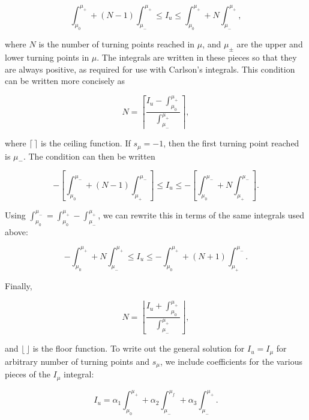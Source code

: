 \documentclass[apj]{emulateapj}
\begin{document}
\begin{equation}\label{tpbad}
 \int_{\mu_0}^{\mu_+} + (N-1) \int_{\mu_-}^{\mu_+} \le I_u \le \int_{\mu_0}^{\mu_+} + N \int_{\mu_-}^{\mu_+},
\end{equation}

\noindent where $N$ is the number of turning points reached in $\mu$, and $\mu_\pm$ are the upper and lower turning points in $\mu$. The integrals are written in these pieces so that they are always positive, as required for use with Carlson's integrals. This condition can be written more concisely as

\begin{equation}\label{tp}
  N = \left \lceil \frac{I_u - \int_{\mu_0}^{\mu_+}}{\int_{\mu_-}^{\mu_+}} \right \rceil,
\end{equation}

\noindent where $\lceil \hspace{2pt} \rceil$ is the ceiling function. If $s_\mu=-1$, then the first turning point reached is $\mu_-$. The condition can then be written

\begin{equation}
 -\left [ \int_{\mu_0}^{\mu_-} + (N-1) \int_{\mu_+}^{\mu_-} \right] \le I_u \le -\left [ \int_{\mu_0}^{\mu_-} + N \int_{\mu_+}^{\mu_-} \right].
\end{equation}

\noindent Using $\int_{\mu_0}^{\mu_-} = \int_{\mu_0}^{\mu_+} - \int_{\mu_-}^{\mu_+}$, we can rewrite this in terms of the same integrals used above:

\begin{equation}
 -\int_{\mu_0}^{\mu_+} + N \int_{\mu_-}^{\mu_+} \le I_u \le -\int_{\mu_0}^{\mu_+} + (N+1) \int_{\mu_+}^{\mu_-}.
\end{equation}

\noindent Finally,

\begin{equation}
 N = \left \lfloor \frac{I_u + \int_{\mu_0}^{\mu_+}}{\int_{\mu_-}^{\mu_+}} \right \rfloor,
\end{equation}

\noindent and $\lfloor \hspace{2pt} \rfloor$ is the floor function. To write out the general solution for $I_u = I_\mu$ for arbitrary number of turning points and $s_\mu$, we include coefficients for the various pieces of the $I_\mu$ integral: 

\begin{equation}\label{mufint}
 I_u = \alpha_1 \int_{\mu_0}^{\mu_+} + \alpha_2 \int_{\mu_-}^{\mu_f} + \alpha_3 \int_{\mu_-}^{\mu_+}.
\end{equation}
\end{document}
